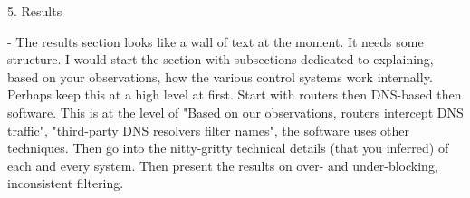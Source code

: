 5. Results

- The results section looks like a wall of text at the moment. It needs some structure. I would start the section with subsections dedicated to explaining, based on your observations, how the various control systems work internally. Perhaps keep this at a high level at first. Start with routers then DNS-based then software. This is at the level of "Based on our observations, routers intercept DNS traffic", "third-party DNS resolvers filter names", the software uses other techniques. Then go into the nitty-gritty technical details (that you inferred) of each and every system. Then present the results on over- and under-blocking, inconsistent filtering.
